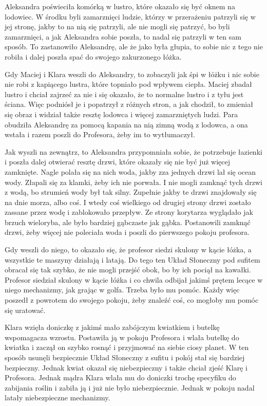 Aleksandra poświeciła komórką w lustro, które okazało się być oknem na lodowiec.
W środku byli zamarznięci ludzie, którzy w przerażeniu patrzyli się w jej stronę, jakby to na nią się patrzyli, ale nie mogli się patrzyć, bo byli zamarznięci, a jak Aleksandra sobie poszła, to nadal się patrzyli w ten sam sposób. To zastanowiło Aleksandrę, ale że jako była głupia, to sobie nic z tego nie robiła i dalej poszła spać do swojego zakurzonego łóżka.

Gdy Maciej i Klara weszli do Aleksandry, to zobaczyli jak śpi w łóżku i nic sobie nie robi z kapiącego lustra, które topniało pod wpływem ciepła. Maciej zbadał lustro i chciał zajrzeć za nie i się okazało, że to normalne lustro i z tyłu jest ściana. Więc podniósł je i popatrzył z różnych stron, a jak chodził, to zmieniał się obraz i widział także resztę lodowca i więcej zamarzniętych ludzi.
Para obudziła Aleksandrę za pomocą kapania na nią zimną wodą z lodowca, a ona wstała i razem poszli do Profesora, żeby im to wytłumaczył.

Jak wyszli na zewnątrz, to Aleksandra przypomniała sobie, że potrzebuje łazienki i poszła dalej otwierać resztę drzwi, które okazały się nie być już więcej zamknięte.
Nagle polała się na nich woda, jakby zza jednych drzwi lał się ocean wody.
Złapali się za klamki, żeby ich nie porwała.
I nie mogli zamknąć tych drzwi z wodą, bo strumień wody był tak silny.
Zupełnie jakby te drzwi znajdowały się na dnie morza, albo coś.
I wtedy coś wielkiego od drugiej strony drzwi zostało zassane przez wodę i zablokowało przepływ.
Ze strony korytarza wyglądało jak brzuch wieloryba, ale było bardziej gąbczaste jak gąbka.
Postanowili zamknąć drzwi, żeby więcej nie poleciała woda i poszli do pierwszego pokoju profesora.

Gdy weszli do niego, to okazało się, że profesor siedzi skulony w kącie łóżka, a wszystkie te maszyny działają i latają. Do tego ten Układ Słoneczny pod sufitem obracał się tak szybko, że nie mogli przejść obok, bo by ich pociął na kawałki.
Profesor siedział skulony w kącie łóżka i co chwila odbijał jakimś prętem lecące w niego mechanizmy, jak grając w golfa. Trzeba było mu pomóc.
Każdy więc poszedł z powrotem do swojego pokoju, żeby znaleźć coś, co mogłoby mu pomóc się uratować.

Klara wzięła doniczkę z jakimś mało zabójczym kwiatkiem i butelkę wspomagacza wzrostu.
Postawiła ją w pokoju Profesora i wlała butelkę do kwiatka i zaczął on szybko rosnąć i przyjmować na siebie ciosy planet. W ten sposób usunęli bezpiecznie Układ Słoneczny z sufitu i pokój stał się bardziej bezpieczny.
Jednak kwiat okazał się niebezpieczny i także chciał zjeść Klarę i Profesora.
Jednak mądra Klara wlała mu do doniczki trochę specyfiku do zabijania roślin i zabiła ją i już nie było niebezpiecznie.
Jednak w pokoju nadal latały niebezpieczne mechanizmy.

